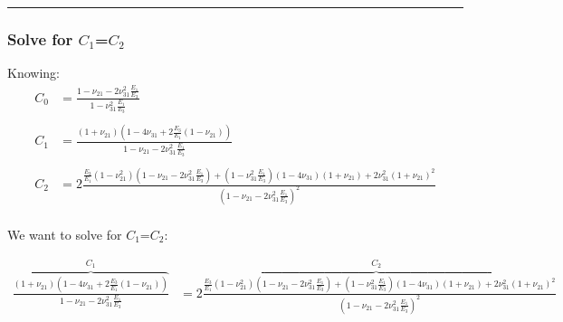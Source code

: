 \documentclass{article}
\begin{document}
\noindent\rule{8cm}{0.4pt}

\subsubsection{Solve for $C_1$=$C_2$}
Knowing:
\begin{align}
C_0 &= \frac{1-\nu_{21}-2\nu_{31}^2\frac{E_1}{E_3}}{1-\nu_{31}^2 \frac{E_1}{E_3}} \\
\\
C_1 &= \frac{\left( 1+\nu_{21} \right) \left( 1-4\nu_{31} + 2 \frac{E_3}{E_1} \left( 1-\nu_{21} \right) \right) }{ 1-\nu_{21}-2\nu_{31}^2\frac{E_1}{E_3} }  \\
\\
C_2 
&= 2 \frac{ \frac{E_3}{E_1} \left( 1-\nu_{21}^2 \right) \left( 1-\nu_{21}-2\nu_{31}^2\frac{E_1}{E_3}  \right) + \left( 1-\nu_{31}^2 \frac{E_1}{E_3} \right) \left(1-4\nu_{31} \right) \left(1+\nu_{21}\right) + 2\nu_{31}^2 \left( 1+\nu_{21} \right)^2 }{ \left( 1-\nu_{21}-2\nu_{31}^2\frac{E_1}{E_3} \right)^2 }   \\
\end{align}

We want to solve for $C_1$=$C_2$:

\begin{align*}
\overbrace{\frac{\left( 1+\nu_{21} \right) \left( 1-4\nu_{31} + 2 \frac{E_3}{E_1} \left( 1-\nu_{21} \right) \right) }{ 1-\nu_{21}-2\nu_{31}^2\frac{E_1}{E_3} } }^{C_1}
&= 
\overbrace{
2 \frac{
    \scriptstyle{
\frac{E_3}{E_1} \left( 1-\nu_{21}^2 \right) \left( 1-\nu_{21}-2\nu_{31}^2\frac{E_1}{E_3}  \right) + \left( 1-\nu_{31}^2 \frac{E_1}{E_3} \right) \left(1-4\nu_{31} \right) \left(1+\nu_{21}\right) + 2\nu_{31}^2 \left( 1+\nu_{21} \right)^2}
}{
\left( 1-\nu_{21}-2\nu_{31}^2\frac{E_1}{E_3} \right)^2 
} }^{C_2}  \tag{A}  \\
\end{align*}
\end{document}
